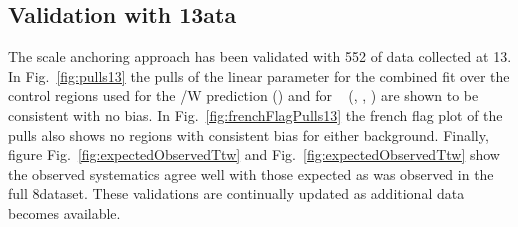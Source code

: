\subsection{Validation with 13\texorpdfstring{\TeV} data}
\label{sec:dataValid13TeV}
The scale anchoring approach has been validated with 552\ipb 
of data collected at 13\TeV. In Fig.~\ref{fig:pulls13} the 
pulls of the linear parameter for the combined fit over
the control regions used for the \ttbar/W prediction (\mj)
and for \zInv~ (\mj, \mmj, \gj) are shown to be consistent with no bias.
In Fig.~\ref{fig:frenchFlagPulls13} the french flag plot of the pulls
also shows no regions with consistent bias for either background.
Finally, figure Fig.~\ref{fig:expectedObservedTtw} and Fig.~\ref{fig:expectedObservedTtw}
show the observed systematics agree well with those expected as 
was observed in the full 8\TeV dataset. These validations are
 continually updated as additional data becomes available.


